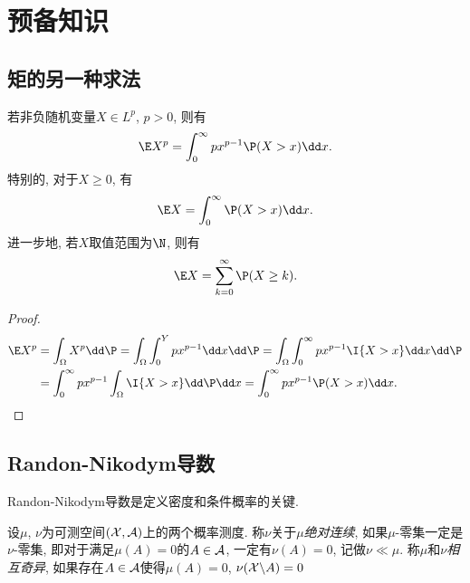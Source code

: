 \section{预备知识}

\subsection{矩的另一种求法}

\begin{lemma}\label{lemma:trickOfExpectation}
	若非负随机变量$X \in L^p$, $p > 0$, 则有
	\begin{equation}
		\E X^p = \int_0^{\infty} p x^{p-1} \P(X > x) \dd x. 
	\end{equation}
	特别的, 对于$X \geq 0$, 有
	\begin{equation*}
		\E X = \int_0^{\infty} \P(X > x) \dd x. 
	\end{equation*}
	进一步地, 若$X$取值范围为$\N$, 则有
	\begin{equation*}
		\E X = \sum_{k=0}^{\infty} \P(X \geq k). 
	\end{equation*}
\end{lemma}
\begin{proof}
	\begin{align*}
		\E X^p 
		&= \int_\Omega X^p \dd \P 
		= \int_\Omega \int_0^Y p x^{p-1} \dd x \dd \P 
		= \int_\Omega \int_0^{\infty} p x^{p-1} \I{X > x} \dd x \dd \P \\
		&= \int_0^{\infty} p x^{p-1} \int_\Omega \I{X > x} \dd \P \dd x
		= \int_0^{\infty} p x^{p-1} \P(X > x) \dd x.
	\end{align*}
\end{proof}

\begin{theorem}[Rademacher]
	
\end{theorem}




\subsection{Randon-Nikodym导数}

Randon-Nikodym导数是定义密度和条件概率的关键. 

设$\mu$, $\nu$为可测空间$(\mathcal{X}, \mathcal{A})$上的两个概率测度. 
称$\nu$关于$\mu$\emph{绝对连续}, 如果$\mu$-零集一定是$\nu$-零集, 即对于满足$\mu(A) = 0$的$A \in \mathcal{A}$, 一定有$\nu(A) = 0$, 记做$\nu \ll \mu$. 
称$\mu$和$\nu$\emph{相互奇异}, 如果存在$A \in \mathcal{A}$使得$\mu(A) = 0$, $\nu(\mathcal{X} \backslash A) = 0$

